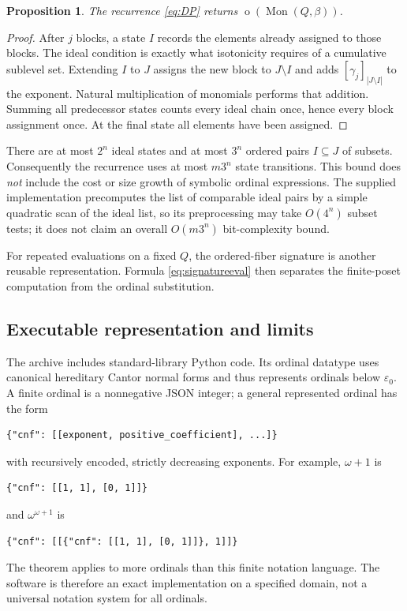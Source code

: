 \documentclass[11pt,a4paper]{article}
\newtheorem{proposition}[proposition]{Proposition}
\theoremstyle{definition}
\theoremstyle{remark}
\newcommand{\Mon}{\operatorname{Mon}}
\newcommand{\otype}{\operatorname{o}}
\newcommand{\Nrep}[2]{\left[#1\right]_{#2}}
\begin{document}
\begin{proposition}\label{prop:DP}
The recurrence \eqref{eq:DP} returns
$\otype(\Mon(Q,\beta))$.
\end{proposition}
\begin{proof}
After $j$ blocks, a state $I$ records the elements already assigned to
those blocks. The ideal condition is exactly what isotonicity requires
of a cumulative sublevel set. Extending $I$ to $J$ assigns the new block
to $J\setminus I$ and adds
$\Nrep{\gamma_j}{|J\setminus I|}$ to the exponent. Natural multiplication
of monomials performs that addition. Summing all predecessor states counts
every ideal chain once, hence every block assignment once. At the final
state all elements have been assigned.
\end{proof}

There are at most $2^n$ ideal states and at most $3^n$ ordered pairs
$I\subseteq J$ of subsets. Consequently the recurrence uses at most
$m3^n$ state transitions. This bound does \emph{not} include the cost or
size growth of symbolic ordinal expressions. The supplied implementation
precomputes the list of comparable ideal pairs by a simple quadratic scan
of the ideal list, so its preprocessing may take $O(4^n)$ subset tests;
it does not claim an overall $O(m3^n)$ bit-complexity bound.

For repeated evaluations on a fixed $Q$, the ordered-fiber signature is
another reusable representation. Formula \eqref{eq:signatureeval} then
separates the finite-poset computation from the ordinal substitution.

\subsection{Executable representation and limits}
The archive includes standard-library Python code. Its ordinal datatype
uses canonical hereditary Cantor normal forms and thus represents ordinals
below $\varepsilon_0$. A finite ordinal is a nonnegative JSON integer;
a general represented ordinal has the form
\begin{lstlisting}
{"cnf": [[exponent, positive_coefficient], ...]}
\end{lstlisting}
with recursively encoded, strictly decreasing exponents. For example,
$\omega+1$ is
\begin{lstlisting}
{"cnf": [[1, 1], [0, 1]]}
\end{lstlisting}
and $\omega^{\omega+1}$ is
\begin{lstlisting}
{"cnf": [[{"cnf": [[1, 1], [0, 1]]}, 1]]}
\end{lstlisting}
The theorem applies to more ordinals than this finite notation language.
The software is therefore an exact implementation on a specified domain,
not a universal notation system for all ordinals.
\end{document}
